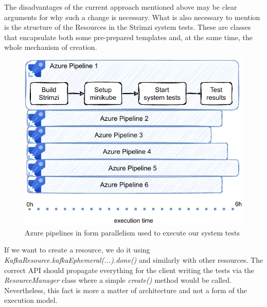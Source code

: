 The disadvantages of the current approach mentioned above may be clear arguments for why such a change is necessary. What is also necessary to mention is the structure of the Resources in the Strimzi system tests. These are classes that encapsulate both some pre-prepared templates and, at the same time, the whole mechanism of creation.
\begin{figure}[!ht]
    \centering
    \includegraphics[scale=1]{obrazky-figures/06-proposal-of-parallel-approach/01a-azure_pipelines_with_test_results.pdf}
    \caption{Azure pipelines in form parallelism used to execute our system tests}
    \label{05:fig:azurepiplines}
\end{figure}
If we want to create a resource, we do it using \emph{KafkaResource.kafkaEphemeral(...).done()} and similarly with other resources. The correct API should propagate everything for the client writing the tests via the \emph{ResourceManager} class where a simple \emph{create()} method would be called. Nevertheless, this fact is more a matter of architecture and not a form of the execution model.


